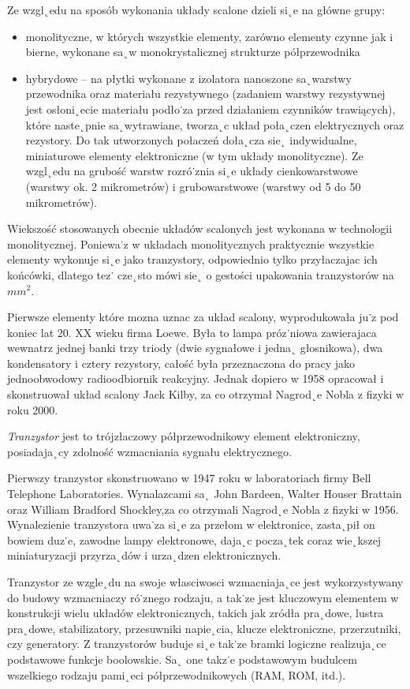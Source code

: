 \documentclass[a4paper,11pt]{article}
\begin{document}
Ze wzgl˛edu na sposób wykonania układy scalone dzieli si˛e na główne grupy:
\begin{itemize}
	\item monolityczne, w których wszystkie elementy, zarówno elementy czynne jak i bierne, wykonane sa˛w monokrystalicznej strukturze półprzewodnika
	\item hybrydowe – na płytki wykonane z izolatora nanoszone sa˛warstwy przewodnika oraz materiału rezystywnego (zadaniem warstwy rezystywnej jest osłoni˛ecie materiału podło˙za przed działaniem czynników trawiących), które naste˛pnie sa˛wytrawiane, tworza˛c układ poła˛czen elektrycznych oraz rezystory. Do tak utworzonych połaczeń doła˛cza sie˛ indywidualne, miniaturowe elementy elektroniczne (w tym układy monolityczne). Ze wzgl˛edu na grubość warstw rozró˙znia si˛e układy cienkowarstwowe (warstwy ok. 2 mikrometrów) i grubowarstwowe (warstwy od 5 do 50 mikrometrów).
\end{itemize}

Wiekszość stosowanych obecnie układów scalonych jest wykonana w technologii monolitycznej. Poniewa˙z w układach monolitycznych praktycznie wszystkie elementy wykonuje si˛e jako tranzystory, odpowiednio tylko przyłaczajac ich końcówki, dlatego tez˙ cze˛sto mówi sie˛ o gestości
upakowania tranzystorów na $mm^2$.

Pierwsze elementy które mozna uznac za układ scalony, wyprodukowała ju˙z pod koniec lat 20. XX wieku firma Loewe. Była to lampa próz˙niowa zawierajaca wewnatrz jednej banki trzy triody (dwie sygnałowe i jedna˛ głosnikowa), dwa kondensatory i cztery rezystory, całość była przeznaczona do pracy jako jednoobwodowy radioodbiornik reakcyjny. Jednak dopiero w 1958
opracował i skonstruował układ scalony Jack Kilby, za co otrzymał Nagrod˛e Nobla z fizyki w roku
2000.

\textsl{Tranzystor} jest to trójzłaczowy półprzewodnikowy element elektroniczny, posiadaja˛cy zdolność wzmacniania sygnału elektrycznego.

Pierwszy tranzystor skonstruowano w 1947 roku w laboratoriach firmy Bell Telephone Laboratories.
Wynalazcami sa˛ John Bardeen, Walter Houser Brattain oraz William Bradford Shockley,za co otrzymali Nagrod˛e Nobla z fizyki w 1956. Wynalezienie tranzystora uwa˙za si˛e za przełom w
elektronice, zasta˛pił on bowiem duz˙e, zawodne lampy elektronowe, daja˛c pocza˛tek coraz wie˛kszej
miniaturyzacji przyrza˛dów i urza˛dzen elektronicznych.

Tranzystor ze wzgle˛du na swoje własciwosci wzmacniaja˛ce jest wykorzystywany do budowy
wzmacniaczy ró˙znego rodzaju, a tak˙ze jest kluczowym elementem w konstrukcji wielu układów
elektronicznych, takich jak zródła pra˛dowe, lustra pra˛dowe, stabilizatory, przesuwniki napie˛cia,
klucze elektroniczne, przerzutniki, czy generatory. Z tranzystorów buduje si˛e tak˙ze bramki logiczne
realizuja˛ce podstawowe funkcje boolowskie. Sa˛ one takz˙e podstawowym budulcem wszelkiego
rodzaju pami˛eci półprzewodnikowych (RAM, ROM, itd.).
\end{document}

